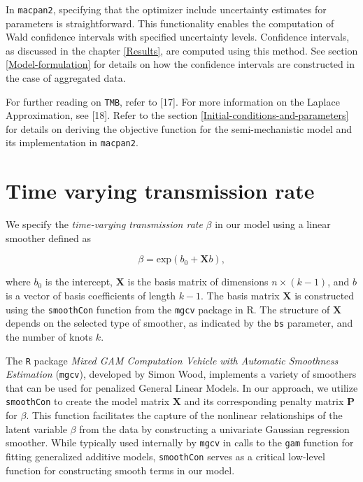 \documentclass[
11pt, %
oneside, %
english, %
singlespacing, %
]{macthesis} %
\begin{document}
In \texttt{macpan2}, specifying that the optimizer include uncertainty estimates for parameters is straightforward. This functionality enables the computation of Wald confidence intervals with specified uncertainty levels. Confidence intervals, as discussed in the chapter \ref{Results}, are computed using this method. See section \ref{Model-formulation} for details on how the confidence intervals are constructed in the case of aggregated data.

For further reading on \texttt{TMB}, refer to {[}17{]}. For more information on the Laplace Approximation, see {[}18{]}. Refer to the section \ref{Initial-conditions-and-parameters} for details on deriving the objective function for the semi-mechanistic model and its implementation in \texttt{macpan2}.

\section{Time varying transmission rate}\label{Time-varying-transmission-rate}

We specify the \emph{time-varying transmission rate} \(\beta\) in our model using a linear smoother defined as

\begin{equation}
\beta = \text{exp}(b_0 + \mathbf{X}b),
\label{eq:linear smoother}
\end{equation}

where \(b_0\) is the intercept, \(\mathbf{X}\) is the basis matrix of dimensions \(n \times (k-1)\), and \(b\) is a vector of basis coefficients of length \(k-1\). The basis matrix \(\mathbf{X}\) is constructed using the \texttt{smoothCon} function from the \texttt{mgcv} package in R. The structure of \(\mathbf{X}\) depends on the selected type of smoother, as indicated by the \texttt{bs} parameter, and the number of knots \(k\).

The \texttt{R} package \emph{Mixed GAM Computation Vehicle with Automatic Smoothness Estimation} (\texttt{mgcv}), developed by Simon Wood, implements a variety of smoothers that can be used for penalized General Linear Models. In our approach, we utilize \texttt{smoothCon} to create the model matrix \(\mathbf{X}\) and its corresponding penalty matrix \(\mathbf{P}\) for \(\beta\). This function facilitates the capture of the nonlinear relationships of the latent variable \(\beta\) from the data by constructing a univariate Gaussian regression smoother. While typically used internally by \texttt{mgcv} in calls to the \texttt{gam} function for fitting generalized additive models, \texttt{smoothCon} serves as a critical low-level function for constructing smooth terms in our model.
\end{document}
